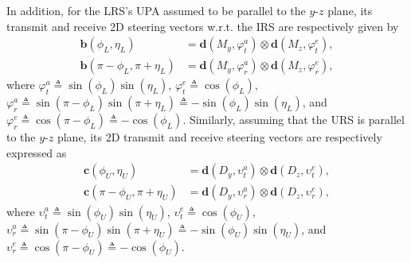 \documentclass[10pt,final,doublecolumn]{IEEEtran}
\begin{document}
In addition, for the LRS's UPA assumed to be parallel to the $y$-$z$ plane, its transmit and receive 2D steering vectors w.r.t. the IRS are respectively given by
\begin{align}\label{ab1}
\mathbf{b}({\phi}_{{L}},{\eta}_{{L}})&=\mathbf{d}(M_{{y}},\varphi_t^a)\otimes \mathbf{d}(M_{{z}},\varphi_t^e),\\
\mathbf{b}(\pi-{\phi}_{{L}},\pi+{\eta}_{{L}})&=
\mathbf{d}(M_{{y}},\varphi_r^{a})\otimes \mathbf{d}(M_{{z}},\varphi_r^{e}),
\end{align}
where $\varphi_t^a\triangleq\sin({\phi}_{{L}})\sin({\eta}_{{L}})$, $\varphi_t^e\triangleq\cos({\phi}_{{L}})$, $\varphi_r^{a}\triangleq\sin(\pi-{\phi}_{{L}})\sin(\pi+{\eta}_{{L}})
\triangleq-\sin({\phi}_{{L}})\sin({\eta}_{{L}})$, and $\varphi_r^{e}\triangleq\cos(\pi-{\phi}_{{L}})\triangleq-\cos({\phi}_{{L}})$.
Similarly, assuming that the URS is parallel to the $y$-$z$ plane, its 2D transmit and receive steering vectors are respectively expressed as
\begin{align}\label{nu}
\mathbf{c}({\phi}_{{U}},{\eta}_{{U}})&=\mathbf{d}(D_{{y}},\upsilon_t^a)\otimes \mathbf{d}(D_{{z}},\upsilon_t^e),\\
\mathbf{c}(\pi-{\phi}_{{U}},\pi+{\eta}_{{U}})&=\mathbf{d}(D_{{y}},\upsilon_r^a)\otimes \mathbf{d}(D_{{z}},\upsilon_r^e),
\end{align}
where $\upsilon_t^a\triangleq\sin({\phi}_{{U}})\sin({\eta}_{{U}})$, $\upsilon_t^e\triangleq\cos({\phi}_{{U}})$, $\upsilon_r^a\triangleq\sin(\pi-{\phi}_{{U}})\sin(\pi+{\eta}_{{U}})
\triangleq-\sin({\phi}_{{U}})\sin({\eta}_{{U}})$, and $\upsilon_r^e\triangleq\cos(\pi-{\phi}_{{U}})
\triangleq-\cos({\phi}_{{U}})$.
\end{document}
